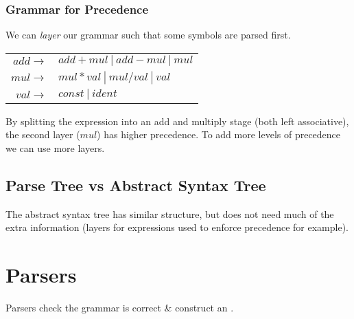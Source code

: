\documentclass{report}
\begin{document}
\subsubsection*{Grammar for Precedence}
We can \textit{layer} our grammar such that some symbols are parsed first.
\begin{center}
	\begin{tabular}{r l }
		$add \to$ & $ add + mul \ | \ add - mul \ | \ mul$ \\
		$mul \to$ & $mul * val \ | \ mul / val \ | \ val$  \\
		$val \to$ & $const \ | \ ident$                    \\
	\end{tabular}
\end{center}
By splitting the expression into an add and multiply stage (both left associative), the second layer ($mul$) has higher precedence. To add more levels of precedence we can use more layers.

\subsection*{Parse Tree vs Abstract Syntax Tree}
The abstract syntax tree has similar structure, but does not need much of the extra information (layers for expressions used to enforce precedence for example).

\section*{Parsers}
Parsers check the grammar is correct \& construct an .

\end{document}
